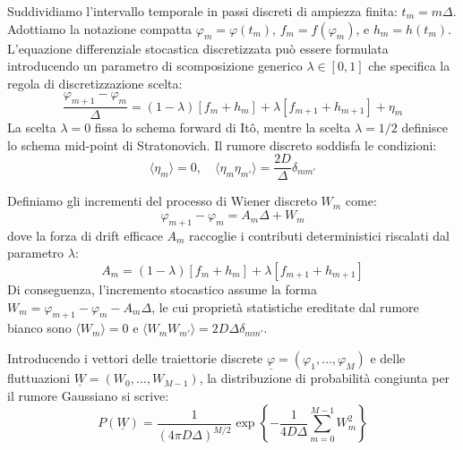 Suddividiamo l'intervallo temporale in passi discreti di ampiezza finita: $t_m = m\Delta$. Adottiamo la notazione compatta $\varphi_m = \varphi(t_m)$, $f_m = f(\varphi_m)$, e $h_m = h(t_m)$. L'equazione differenziale stocastica discretizzata può essere formulata introducendo un parametro di scomposizione generico $\lambda \in [0,1]$ che specifica la regola di discretizzazione scelta:
\begin{equation}
\frac{\varphi_{m+1}-\varphi_m}{\Delta} = (1-\lambda)[f_m+h_m] + \lambda[f_{m+1}+h_{m+1}] + \eta_m
\label{eq:langevin_discretizzata_gen}
\end{equation}
La scelta $\lambda=0$ fissa lo schema forward di Itô, mentre la scelta $\lambda=1/2$ definisce lo schema mid-point di Stratonovich. Il rumore discreto soddisfa le condizioni:
\begin{equation}
\langle \eta_m \rangle = 0, \quad \langle \eta_m \eta_{m'} \rangle = \frac{2D}{\Delta}\delta_{mm'}
\end{equation}

Definiamo gli incrementi del processo di Wiener discreto $W_m$ come:
\begin{equation}
\varphi_{m+1}-\varphi_m = A_m \Delta + W_m
\end{equation}
dove la forza di drift efficace $A_m$ raccoglie i contributi deterministici riscalati dal parametro $\lambda$:
\begin{equation}
A_m = (1-\lambda)[f_m+h_m] + \lambda[f_{m+1}+h_{m+1}]
\end{equation}
Di conseguenza, l'incremento stocastico assume la forma $W_m = \varphi_{m+1}-\varphi_m - A_m\Delta$, le cui proprietà statistiche ereditate dal rumore bianco sono $\langle W_m \rangle = 0$ e $\langle W_m W_{m'} \rangle = 2D\Delta \delta_{mm'}$.

Introducendo i vettori delle traiettorie discrete $\underline{\varphi} = (\varphi_1, \dots, \varphi_M)$ e delle fluttuazioni $\underline{W} = (W_0, \dots, W_{M-1})$, la distribuzione di probabilità congiunta per il rumore Gaussiano si scrive:
\begin{equation}
P(\underline{W}) = \frac{1}{(4\pi D\Delta)^{M/2}} \exp\left\{ -\frac{1}{4D\Delta} \sum_{m=0}^{M-1} W_m^2 \right\}
\label{eq:prob_rumore_discreto}
\end{equation}

